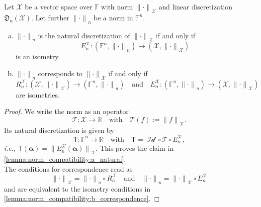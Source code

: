 \documentclass[a4paper]{paper}
\newcommand{\Discr}{\mathfrak{D}}
\newcommand{\Spc}[1]{\mathscr{#1}}
\newcommand{\Field}{\mathbb{F}}
\newcommand{\Real}{\mathbb{R}}
\newcommand{\Op}[1]{\mathcal{#1}}
\newcommand{\DiscOp}[1]{\mathsf{#1}}
\newcommand*{\EXT}[2]{\ensuremath{E_{#1}^{#2}}}
\newcommand*{\REST}[2]{\ensuremath{R_{#1}^{#2}}}
\newcommand*{\RnX}{\ensuremath{\REST{n}{\Spc{X}}}}
\newcommand*{\EnX}{\ensuremath{\EXT{n}{\Spc{X}}}}
\DeclareMathOperator{\Id}{Id}
\newcommand{\ie}{\textsl{i.e.}\xspace}
\newcommand{\valpha}{\boldsymbol{\alpha}}
\newcommand*{\NORM}[1]{\ensuremath{\lVert #1 \rVert}}
\begin{document}
\begin{lemma}
 \label{lemma:norm_compatibility}
 Let $\Spc{X}$ be a vector space over $\Field$ with norm $\NORM{\cdot}_{\Spc{X}}$ and linear discretization 
 $\Discr_n(\Spc{X})$. Let further $\NORM{\cdot}_n$ be a norm in $\Field^n$.
 \begin{enumerate}[(a)]
  \item \label{lemma:norm_compatibility:a_natural}
  $\NORM{\cdot}_n$ is the natural discretization of $\NORM{\cdot}_{\Spc{X}}$ if and only if
  \begin{equation*}
   \EnX \colon (\Field^n, \NORM{\cdot}_n) \to (\Spc{X}, \NORM{\cdot}_{\Spc{X}})
  \end{equation*}
  is an isometry.
  
  \item \label{lemma:norm_compatibility:b_correspondence}
  $\NORM{\cdot}_n$ corresponds to $\NORM{\cdot}_{\Spc{X}}$ if and only if
  \begin{equation*}
   \RnX \colon (\Spc{X}, \NORM{\cdot}_{\Spc{X}}) \to (\Field^n, \NORM{\cdot}_n)
   \quad \text{and} \quad
   \EnX \colon (\Field^n, \NORM{\cdot}_n) \to (\Spc{X}, \NORM{\cdot}_{\Spc{X}})
  \end{equation*}
  are isometries.
 \end{enumerate}
\end{lemma}

\begin{proof}
 We write the norm as an operator
 \begin{equation*}
  \Op{T} \colon \Spc{X} \to \Real \quad \text{with} \quad \Op{T}(f) := \NORM{f}_{\Spc{X}}.
 \end{equation*}
 Its natural discretization is given by
 \begin{equation*}
  \DiscOp{T} \colon \Field^n \to \Real \quad \text{with} \quad \DiscOp{T} = \Op{\Id} \circ \Op{T} \circ \EnX,
 \end{equation*}
 \ie, $\DiscOp{T}(\valpha) = \NORM{\EnX(\valpha)}_{\Spc{X}}$. This proves the claim in 
 \eqref{lemma:norm_compatibility:a_natural}.\\
 The conditions for correspondence read as
 \begin{equation*}
  \NORM{\cdot}_{\Spc{X}} = \NORM{\cdot}_n \circ \RnX
  \quad \text{and} \quad
  \NORM{\cdot}_n = \NORM{\cdot}_{\Spc{X}} \circ \EnX
 \end{equation*}
 and are equivalent to the isometry conditions in \eqref{lemma:norm_compatibility:b_correspondence}.
\end{proof}
\end{document}
